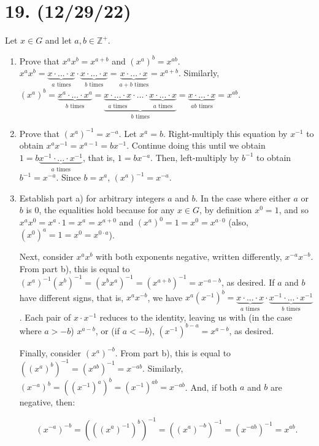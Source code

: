 \documentclass{article}
\begin{document}
\section*{19. (12/29/22)}

Let $x \in G$ and let $a, b \in \mathbb{Z}^+$. 

\begin{enumerate}[label=(\alph*)]
      \item Prove that $x^a x^b = x^{a + b}$ and $(x^a)^b = x^{ab}$.\newline
            $x^a x^b = \underbrace{x \cdot ... \cdot x}_{\text{$a$ times}} \cdot \underbrace{x \cdot ... \cdot x}_{\text{$b$ times}} = \underbrace{x \cdot ... \cdot x}_{\text{$a + b$ times}} = x^{a + b}$.\newline
            Similarly, $(x^a)^b = \underbrace{x^a \cdot ... \cdot x^a}_{\text{$b$ times}} = \underbrace{\underbrace{x \cdot ... \cdot x}_{\text{$a$ times}} \cdot ... \cdot \underbrace{x \cdot ... \cdot x}_{\text{$a$ times}}}_{\text{$b$ times}} = \underbrace{x \cdot ... \cdot x}_{\text{$ab$ times}} = x^{ab}$.
      \item Prove that $(x^a)^{-1} = x^{-a}$.\newline
            Let $x^a = b$. Right-multiply this equation by $x^{-1}$ to obtain $x^a x^{-1} = x^{a - 1} = b x^{-1}$. Continue doing this until we obtain $1 = b \underbrace{x^{-1} \cdot ... \cdot x^{-1}}_{\text{$a$ times}}$, that is, $1 = b x^{-a}$. Then, left-multiply by $b^{-1}$ to obtain $b^{-1} = x^{-a}$. Since $b = x^a$, $(x^{a})^{-1} = x^{-a}$.
      \item Establish part a) for arbitrary integers $a$ and $b$.\newline
            In the case where either $a$ or $b$ is $0$, the equalities hold because for any $x \in G$, by definition $x^0 = 1$, and so $x^a x^0 = x^a \cdot 1 = x^a = x^{a + 0}$ and $(x^a)^0 = 1 = x^0 = x^{a \cdot 0}$ (also, $(x^0)^a = 1 = x^0 = x^{0 \cdot a}$).
            
      Next, consider $x^a x^b$ with both exponents negative, written differently, $x^{-a} x^{-b}$. From part b), this is equal to $(x^a)^{-1} (x^b)^{-1} = (x^b x^a)^{-1} = (x^{a + b})^{-1} = x^{-a - b}$, as desired. If $a$ and $b$ have different signs, that is, $x^a x^{-b}$, we have $x^a (x^{-1})^b = \underbrace{x \cdot ... \cdot x}_{\text{$a$ times}} \cdot \underbrace{x^{-1} \cdot ... \cdot x^{-1}}_{\text{$b$ times}}$. Each pair of $x \cdot x^{-1}$ reduces to the identity, leaving us with (in the case where $a > -b$) $x^{a - b}$, or (if $a < -b$), $(x^{-1})^{b - a} = x^{a - b}$, as desired.

      Finally, consider $(x^a)^{-b}$. From part b), this is equal to $((x^a)^b)^{-1} = (x^{ab})^{-1} = x^{-ab}$. Similarly, $(x^{-a})^b = ((x^{-1})^a)^b = (x^{-1})^{ab} = x^{-ab}$. And, if both $a$ and $b$ are negative, then:
      
      \begin{equation*}
            (x^{-a})^{-b} = (((x^a)^{-1})^b)^{-1} = ((x^a)^{-b})^{-1} = (x^{-ab})^{-1} = x^{ab}.
      \end{equation*}
\end{enumerate}
\end{document}
